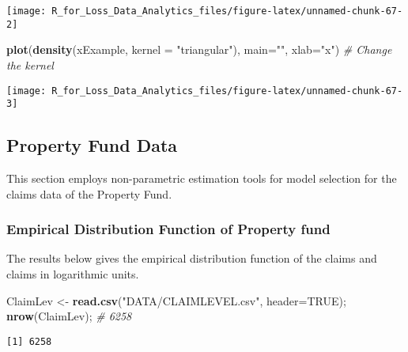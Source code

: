 \documentclass[]{book}
\newenvironment{Shaded}{\begin{snugshade}}{\end{snugshade}}
\newcommand{\KeywordTok}[1]{\textcolor[rgb]{0.13,0.29,0.53}{\textbf{#1}}}
\newcommand{\DataTypeTok}[1]{\textcolor[rgb]{0.13,0.29,0.53}{#1}}
\newcommand{\StringTok}[1]{\textcolor[rgb]{0.31,0.60,0.02}{#1}}
\newcommand{\CommentTok}[1]{\textcolor[rgb]{0.56,0.35,0.01}{\textit{#1}}}
\newcommand{\OtherTok}[1]{\textcolor[rgb]{0.56,0.35,0.01}{#1}}
\newcommand{\NormalTok}[1]{#1}
\theoremstyle{definition}
\theoremstyle{definition}
\theoremstyle{definition}
\theoremstyle{remark}
\begin{document}
\begin{center}\texttt{[image: R\_for\_Loss\_Data\_Analytics\_files/figure-latex/unnamed-chunk-67-2]} \end{center}

\begin{Shaded}
\begin{Highlighting}[]
\KeywordTok{plot}\NormalTok{(}\KeywordTok{density}\NormalTok{(xExample, }\DataTypeTok{kernel =} \StringTok{"triangular"}\NormalTok{), }\DataTypeTok{main=}\StringTok{""}\NormalTok{, }\DataTypeTok{xlab=}\StringTok{"x"}\NormalTok{) }\CommentTok{# Change the kernel}
\end{Highlighting}
\end{Shaded}

\begin{center}\texttt{[image: R\_for\_Loss\_Data\_Analytics\_files/figure-latex/unnamed-chunk-67-3]} \end{center}

\subsection{Property Fund Data}\label{property-fund-data}

This section employs non-parametric estimation tools for model selection
for the claims data of the Property Fund.

\subsubsection{Empirical Distribution Function of Property
fund}\label{empirical-distribution-function-of-property-fund}

The results below gives the empirical distribution function of the
claims and claims in logarithmic units.

\begin{Shaded}
\begin{Highlighting}[]
\NormalTok{ClaimLev <-}\StringTok{ }\KeywordTok{read.csv}\NormalTok{(}\StringTok{"DATA/CLAIMLEVEL.csv"}\NormalTok{, }\DataTypeTok{header=}\OtherTok{TRUE}\NormalTok{); }\KeywordTok{nrow}\NormalTok{(ClaimLev); }\CommentTok{# 6258}
\end{Highlighting}
\end{Shaded}

\begin{verbatim}
[1] 6258
\end{verbatim}
\end{document}
